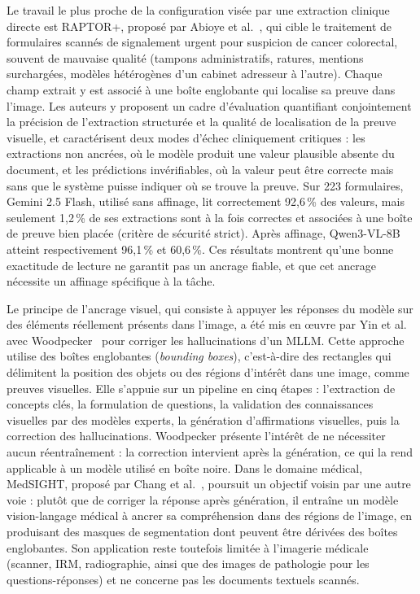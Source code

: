 Le travail le plus proche de la configuration visée par une extraction clinique directe est RAPTOR+, proposé par Abioye et al.~\cite{raptorplus2026}, qui cible le traitement de formulaires scannés de signalement urgent pour suspicion de cancer colorectal, souvent de mauvaise qualité (tampons administratifs, ratures, mentions surchargées, modèles hétérogènes d'un cabinet adresseur à l'autre). Chaque champ extrait y est associé à une boîte englobante qui localise sa preuve dans l'image. Les auteurs y proposent un cadre d'évaluation quantifiant conjointement la précision de l'extraction structurée et la qualité de localisation de la preuve visuelle, et caractérisent deux modes d'échec cliniquement critiques : les extractions non ancrées, où le modèle produit une valeur plausible absente du document, et les prédictions invérifiables, où la valeur peut être correcte mais sans que le système puisse indiquer où se trouve la preuve. Sur 223 formulaires, Gemini 2.5 Flash, utilisé sans affinage, lit correctement 92,6\,\% des valeurs, mais seulement 1,2\,\% de ses extractions sont à la fois correctes et associées à une boîte de preuve bien placée (critère de sécurité strict). Après affinage, Qwen3-VL-8B atteint respectivement 96,1\,\% et 60,6\,\%. Ces résultats montrent qu'une bonne exactitude de lecture ne garantit pas un ancrage fiable, et que cet ancrage nécessite un affinage spécifique à la tâche.

Le principe de l'ancrage visuel, qui consiste à appuyer les réponses du modèle sur des éléments réellement présents dans l'image, a été mis en œuvre par Yin et al. avec Woodpecker~\cite{woodpecker2023} pour corriger les hallucinations d'un MLLM. Cette approche utilise des boîtes englobantes (\textit{bounding boxes}), c'est-à-dire des rectangles qui délimitent la position des objets ou des régions d'intérêt dans une image, comme preuves visuelles. Elle s'appuie sur un pipeline en cinq étapes : l'extraction de concepts clés, la formulation de questions, la validation des connaissances visuelles par des modèles experts, la génération d'affirmations visuelles, puis la correction des hallucinations. Woodpecker présente l'intérêt de ne nécessiter aucun réentraînement : la correction intervient après la génération, ce qui la rend applicable à un modèle utilisé en boîte noire. Dans le domaine médical, MedSIGHT, proposé par Chang et al.~\cite{chang2026medsight}, poursuit un objectif voisin par une autre voie : plutôt que de corriger la réponse après génération, il entraîne un modèle vision-langage médical à ancrer sa compréhension dans des régions de l'image, en produisant des masques de segmentation dont peuvent être dérivées des boîtes englobantes. Son application reste toutefois limitée à l'imagerie médicale (scanner, IRM, radiographie, ainsi que des images de pathologie pour les questions-réponses) et ne concerne pas les documents textuels scannés.

